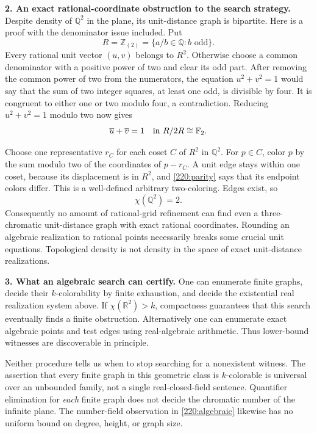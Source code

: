\documentclass[11pt,a4paper]{article}
\newcommand{\Z}{\mathbb{Z}}
\newcommand{\Q}{\mathbb{Q}}
\newcommand{\R}{\mathbb{R}}
\newcommand{\F}{\mathbb{F}}
\numberwithin{equation}{section}
\begin{document}
\textbf{2. An exact rational-coordinate obstruction to the search strategy.}
Despite density of $\Q^2$ in the plane, its unit-distance graph is
bipartite. Here is a proof with the denominator issue included. Put
\[
 R=\Z_{(2)}=\{a/b\in\Q:b\text{ odd}\}.
\]
Every rational unit vector $(u,v)$ belongs to $R^2$. Otherwise choose a
common denominator with a positive power of two and clear its odd part.
After removing the common power of two from the numerators, the equation
$u^2+v^2=1$ would say that the sum of two integer squares, at least one
odd, is divisible by four. It is congruent to either one or two modulo
four, a contradiction. Reducing $u^2+v^2=1$ modulo two now gives
\begin{equation}\label{220:parity}
 \overline u+\overline v=1\quad\hbox{in }R/2R\cong\F_2.
\end{equation}

Choose one representative $r_C$ for each coset $C$ of $R^2$ in $\Q^2$.
For $p\in C$, color $p$ by the sum modulo two of the coordinates of
$p-r_C$. A unit edge stays within one coset, because its displacement is
in $R^2$, and \eqref{220:parity} says that its endpoint colors differ.
This is a well-defined arbitrary two-coloring. Edges exist, so
\[
 \chi(\Q^2)=2.
\]
Consequently no amount of rational-grid refinement can find even a
three-chromatic unit-distance graph with exact rational coordinates.
Rounding an algebraic realization to rational points necessarily breaks
some crucial unit equations. Topological density is not density in the
space of exact unit-distance realizations.

\textbf{3. What an algebraic search can certify.}
One can enumerate finite graphs, decide their $k$-colorability by finite
exhaustion, and decide the existential real realization system above.
If $\chi(\R^2)>k$, compactness guarantees that this search eventually
finds a finite obstruction. Alternatively one can enumerate exact
algebraic points and test edges using real-algebraic arithmetic. Thus
lower-bound witnesses are discoverable in principle.

Neither procedure tells us when to stop searching for a nonexistent
witness. The assertion that every finite graph in this geometric class
is $k$-colorable is universal over an unbounded family, not a single
real-closed-field sentence. Quantifier elimination for \emph{each}
finite graph does not decide the chromatic number of the infinite plane.
The number-field observation in \eqref{220:algebraic} likewise has no
uniform bound on degree, height, or graph size.
\end{document}
